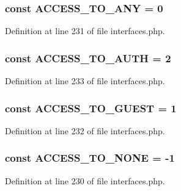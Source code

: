\hypertarget{group__constants_ga8b17406db740d630ae61ecf3cd9bbd8c}{
\subsubsection[{ACCESS\_\-TO\_\-ANY}]{\setlength{\rightskip}{0pt plus 5cm}const ACCESS\_\-TO\_\-ANY = 0}}
\label{group__constants_ga8b17406db740d630ae61ecf3cd9bbd8c}


Definition at line 231 of file interfaces.php.

\hypertarget{group__constants_ga437b41cb9e13e41157d57e7736366295}{
\subsubsection[{ACCESS\_\-TO\_\-AUTH}]{\setlength{\rightskip}{0pt plus 5cm}const ACCESS\_\-TO\_\-AUTH = 2}}
\label{group__constants_ga437b41cb9e13e41157d57e7736366295}


Definition at line 233 of file interfaces.php.

\hypertarget{group__constants_gaaef8a39bfe4d39dca0f45fdb837a8d59}{
\subsubsection[{ACCESS\_\-TO\_\-GUEST}]{\setlength{\rightskip}{0pt plus 5cm}const ACCESS\_\-TO\_\-GUEST = 1}}
\label{group__constants_gaaef8a39bfe4d39dca0f45fdb837a8d59}


Definition at line 232 of file interfaces.php.

\hypertarget{group__constants_ga63d56389fe1e58d0b097471ca4f4dc00}{
\subsubsection[{ACCESS\_\-TO\_\-NONE}]{\setlength{\rightskip}{0pt plus 5cm}const ACCESS\_\-TO\_\-NONE = -\/1}}
\label{group__constants_ga63d56389fe1e58d0b097471ca4f4dc00}


Definition at line 230 of file interfaces.php.


